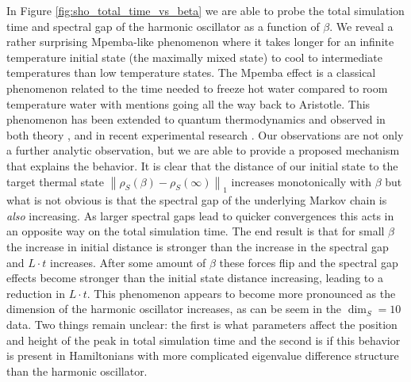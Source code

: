 \documentclass[
 amsmath,amssymb,
 aps,
onecolumn, 
nofootinbib]{revtex4-2}
\newcommand{\norm}[1]{\left\| #1 \right\|}
\begin{document}
In Figure \ref{fig:sho_total_time_vs_beta} we are able to probe the total simulation time and spectral gap of the harmonic oscillator as a function of $\beta$. We reveal a rather surprising Mpemba-like phenomenon where it takes longer for an infinite temperature initial state (the maximally mixed state) to cool to intermediate temperatures than low temperature states. The Mpemba effect \cite{mpemba} is a classical phenomenon related to the time needed to freeze hot water compared to room temperature water with mentions going all the way back to Aristotle. This phenomenon has been extended to quantum thermodynamics and observed in both theory \cite{nickMpemba}, \cite{mpembaExplanation} and in recent experimental research \cite{zhang2025mpembaObservation}. Our observations are not only a further analytic observation, but we are able to provide a proposed mechanism that explains the behavior. It is clear that the distance of our initial state to the target thermal state $\norm{\rho_S(\beta) - \rho_S(\infty)}_1$ increases monotonically with $\beta$ but what is not obvious is that the spectral gap of the underlying Markov chain is \emph{also} increasing. As larger spectral gaps lead to quicker convergences this acts in an opposite way on the total simulation time. The end result is that for small $\beta$ the increase in initial distance is stronger than the increase in the spectral gap and $L \cdot t$ increases. After some amount of $\beta$ these forces flip and the spectral gap effects become stronger than the initial state distance increasing, leading to a reduction in $L \cdot t$. This phenomenon appears to become more pronounced as the dimension of the harmonic oscillator increases, as can be seem in the $\dim_S = 10$ data. Two things remain unclear: the first is what parameters affect the position and height of the peak in total simulation time and the second is if this behavior is present in Hamiltonians with more complicated eigenvalue difference structure than the harmonic oscillator.
\end{document}

